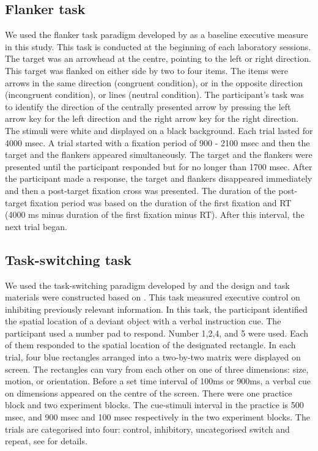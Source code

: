 \subsection{Flanker task}
We used the flanker task paradigm developed by \cite{Eriksen1974} as a baseline executive measure in this study. This task is conducted at the beginning of each laboratory sessions. The target was an arrowhead at the centre, pointing to the left or right direction. This target was flanked on either side by two to four items. The items were arrows in the same direction (congruent condition), or in the opposite direction (incongruent condition), or lines (neutral condition). The participant’s task was to identify the direction of the centrally presented arrow by pressing the left arrow key for the left direction and the right arrow key for the right direction. The stimuli were white and displayed on a black background. Each trial lasted for 4000 msec. A trial started with a fixation period of 900 - 2100 msec and then the target and the flankers appeared simultaneously. The target and the flankers were presented until the participant responded but for no longer than 1700 msec.  After the participant made a response, the target and flankers disappeared immediately and then a post-target fixation cross was presented. The duration of the post-target fixation period was based on the duration of the first fixation and RT (4000 ms minus duration of the first fixation minus RT). After this interval, the next trial began.

\subsection{Task-switching task}
\label{appendix:study1:subsection2:TS}
We used the task-switching paradigm developed by \cite{Mayr2000} and the design and task materials were constructed based on \cite{Whitmer2007}. This task measured executive control on inhibiting previously relevant information. In this task, the participant identified the spatial location of a deviant object with a verbal instruction cue. The participant used a number pad to respond. Number 1,2,4, and 5 were used. Each of them responded to the spatial location of the designated rectangle. In each trial, four blue rectangles arranged into a two-by-two matrix were displayed on screen. The rectangles can vary from each other on one of three dimensions: size, motion, or orientation. Before a set time interval of 100ms or 900ms, a verbal cue on dimensions appeared on the centre of the screen. There were one practice block and two experiment blocks. The cue-stimuli interval in the practice is 500 msec, and 900 msec and 100 msec respectively in the two experiment blocks. The trials are categorised into four: control, inhibitory, uncategorised switch and repeat, see \cite{Whitmer2007} for details.

